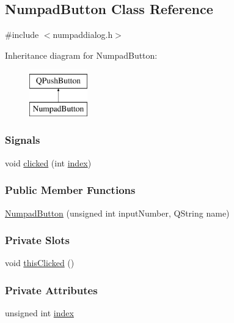 \hypertarget{classNumpadButton}{}\subsection{Numpad\+Button Class Reference}
\label{classNumpadButton}


{\ttfamily \#include $<$numpaddialog.\+h$>$}

Inheritance diagram for Numpad\+Button\+:\begin{figure}[H]
\begin{center}
\leavevmode
\includegraphics[height=2.000000cm]{classNumpadButton}
\end{center}
\end{figure}
\subsubsection*{Signals}
\begin{DoxyCompactItemize}
\item 
void \mbox{\hyperlink{classNumpadButton_abb1a48f3c07d93edef33528e70e77ed7}{clicked}} (int \mbox{\hyperlink{classNumpadButton_a30f48faa378ce82a0cf63f6cdd781f0b}{index}})
\end{DoxyCompactItemize}
\subsubsection*{Public Member Functions}
\begin{DoxyCompactItemize}
\item 
\mbox{\hyperlink{classNumpadButton_af9f2a23d3636ab52dc1a9fd3b08d7275}{Numpad\+Button}} (unsigned int input\+Number, Q\+String name)
\end{DoxyCompactItemize}
\subsubsection*{Private Slots}
\begin{DoxyCompactItemize}
\item 
void \mbox{\hyperlink{classNumpadButton_ae8d4b24f9b83f0cb9cc9a97c0e1055e4}{this\+Clicked}} ()
\end{DoxyCompactItemize}
\subsubsection*{Private Attributes}
\begin{DoxyCompactItemize}
\item 
unsigned int \mbox{\hyperlink{classNumpadButton_a30f48faa378ce82a0cf63f6cdd781f0b}{index}}
\end{DoxyCompactItemize}


